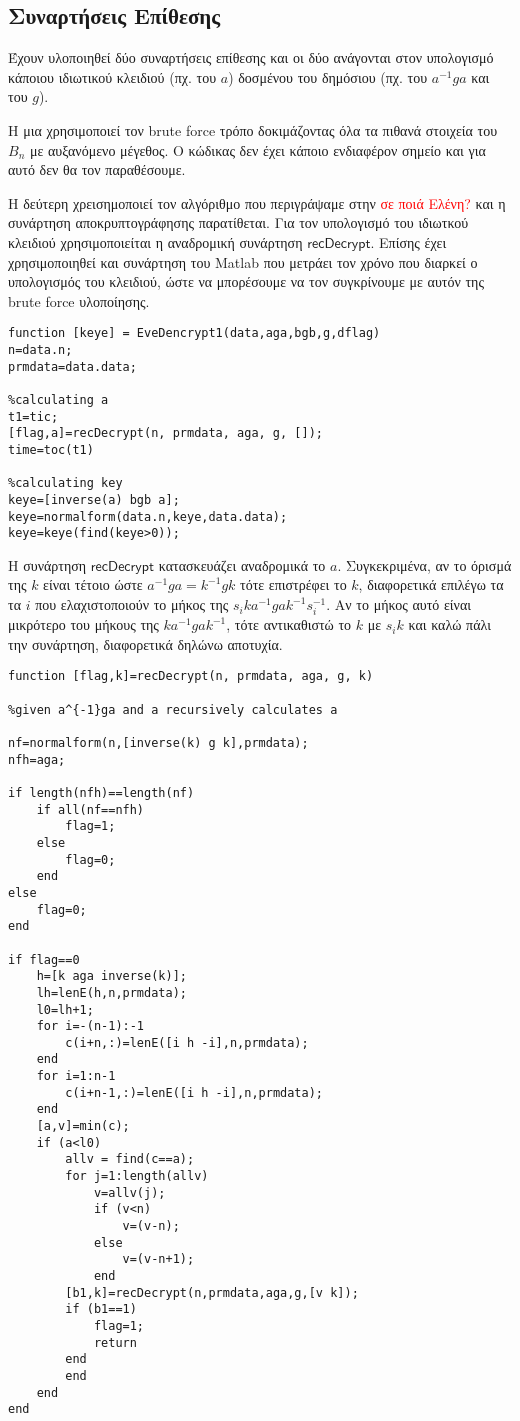 \documentclass[a4paper,11pt]{article}
\newcommand\ntext[1]{\ensuremath{\mathsf{#1}}}
\begin{document}
\subsection{Συναρτήσεις Επίθεσης}

Έχουν υλοποιηθεί δύο συναρτήσεις επίθεσης και οι δύο ανάγονται στον υπολογισμό κάποιου ιδιωτικού κλειδιού (πχ. του $ a $) δοσμένου του δημόσιου (πχ. του $ a^{-1}ga $ και του $ g $).

Η μια χρησιμοποιεί τον brute force τρόπο δοκιμάζοντας όλα τα πιθανά στοιχεία του $ B_n $ με αυξανόμενο μέγεθος. Ο κώδικας δεν έχει κάποιο ενδιαφέρον σημείο και για αυτό δεν θα τον παραθέσουμε.

Η δεύτερη χρεισημοποιεί τον αλγόριθμο που περιγράψαμε στην \textcolor{red}{σε ποιά Ελένη?} και η συνάρτηση αποκρυπτογράφησης παρατίθεται. Για τον υπολογισμό του ιδιωτκού κλειδιού χρησιμοποιείται η αναδρομική συνάρτηση \ntext{recDecrypt}. Επίσης έχει χρησιμοποιηθεί και συνάρτηση του Matlab που μετράει τον χρόνο που διαρκεί ο υπολογισμός του κλειδιού, ώστε να μπορέσουμε να τον συγκρίνουμε με αυτόν της brute force υλοποίησης.

\begin{lstlisting}
function [keye] = EveDencrypt1(data,aga,bgb,g,dflag)
n=data.n;
prmdata=data.data;

%calculating a
t1=tic;
[flag,a]=recDecrypt(n, prmdata, aga, g, []);
time=toc(t1)

%calculating key
keye=[inverse(a) bgb a];
keye=normalform(data.n,keye,data.data);
keye=keye(find(keye>0));
\end{lstlisting}

Η συνάρτηση \ntext{recDecrypt} κατασκευάζει αναδρομικά το $ a $. 
Συγκεκριμένα, αν το όρισμά της $ k $ είναι τέτοιο ώστε $ a^{-1}ga=k^{-1}gk$ τότε επιστρέφει το $ k $, διαφορετικά επιλέγω τα τα $ i $ που ελαχιστοποιούν το μήκος της $ s_i k a^{-1}ga k^{-1} s_i^{-1}$. Αν το μήκος αυτό είναι μικρότερο του μήκους της  $ k a^{-1}ga k^{-1}$, τότε αντικαθιστώ το $ k $ με $ s_ik $ και καλώ πάλι την συνάρτηση, διαφορετικά δηλώνω αποτυχία.

\begin{lstlisting}
function [flag,k]=recDecrypt(n, prmdata, aga, g, k)

%given a^{-1}ga and a recursively calculates a

nf=normalform(n,[inverse(k) g k],prmdata);
nfh=aga;

if length(nfh)==length(nf)
    if all(nf==nfh)
        flag=1;
    else
        flag=0;
    end
else
    flag=0;
end
  
if flag==0 
    h=[k aga inverse(k)];
    lh=lenE(h,n,prmdata);
    l0=lh+1;
    for i=-(n-1):-1
        c(i+n,:)=lenE([i h -i],n,prmdata);
    end
    for i=1:n-1
        c(i+n-1,:)=lenE([i h -i],n,prmdata);
    end
    [a,v]=min(c);
    if (a<l0)
        allv = find(c==a);
        for j=1:length(allv)
            v=allv(j);
            if (v<n)
                v=(v-n);
            else
                v=(v-n+1);
            end
        [b1,k]=recDecrypt(n,prmdata,aga,g,[v k]);
        if (b1==1)
            flag=1;
            return
        end
        end
    end
end
\end{lstlisting}
\end{document}
